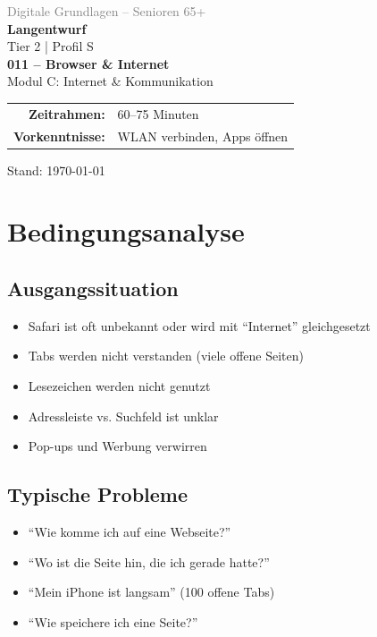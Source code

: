 \documentclass[11pt,a4paper]{article}
\begin{document}
\begin{titlepage}
    \centering
    \vspace*{2cm}
    {\Large\textcolor{gray}{Digitale Grundlagen -- Senioren 65+}}\\[2cm]
    {\Huge\textcolor{fach}{\textbf{Langentwurf}}}\\[0.5cm]
    {\large Tier 2 | Profil S}\\[2cm]
    {\LARGE\textbf{011 -- Browser \& Internet}}\\[0.5cm]
    {\large Modul C: Internet \& Kommunikation}\\[2cm]
    \begin{tabular}{rl}
        \textbf{Zeitrahmen:} & 60--75 Minuten \\
        \textbf{Vorkenntnisse:} & WLAN verbinden, Apps öffnen \\
    \end{tabular}
    \vfill
    {\normalsize Stand: \today}
\end{titlepage}

\tableofcontents
\newpage

\section{Bedingungsanalyse}

\subsection{Ausgangssituation}
\begin{itemize}
    \item Safari ist oft unbekannt oder wird mit ``Internet'' gleichgesetzt
    \item Tabs werden nicht verstanden (viele offene Seiten)
    \item Lesezeichen werden nicht genutzt
    \item Adressleiste vs. Suchfeld ist unklar
    \item Pop-ups und Werbung verwirren
\end{itemize}

\subsection{Typische Probleme}
\begin{itemize}
    \item ``Wie komme ich auf eine Webseite?''
    \item ``Wo ist die Seite hin, die ich gerade hatte?''
    \item ``Mein iPhone ist langsam'' (100 offene Tabs)
    \item ``Wie speichere ich eine Seite?''
\end{itemize}
\end{document}
